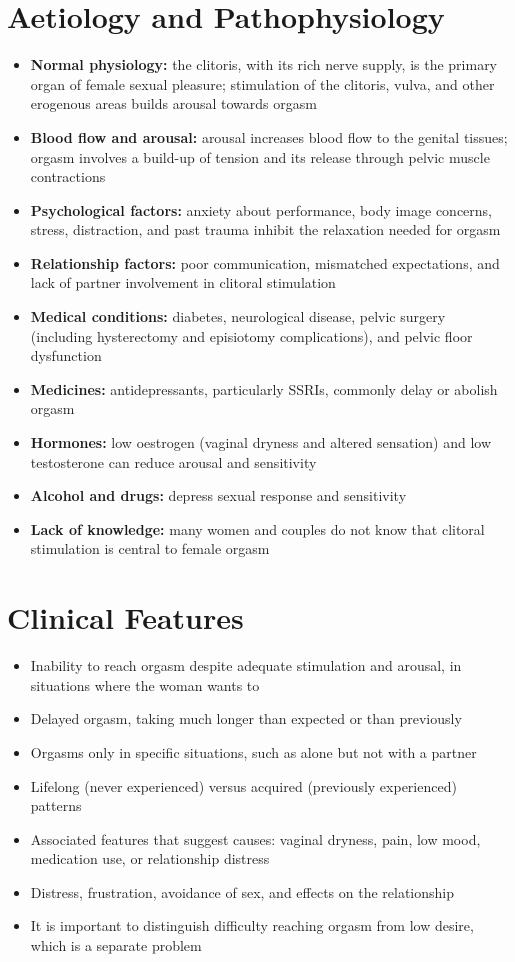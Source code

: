 \section*{Aetiology and Pathophysiology}
\begin{itemize}
    \item \textbf{Normal physiology:} the clitoris, with its rich nerve supply, is the primary organ of female sexual pleasure; stimulation of the clitoris, vulva, and other erogenous areas builds arousal towards orgasm
    \item \textbf{Blood flow and arousal:} arousal increases blood flow to the genital tissues; orgasm involves a build-up of tension and its release through pelvic muscle contractions
    \item \textbf{Psychological factors:} anxiety about performance, body image concerns, stress, distraction, and past trauma inhibit the relaxation needed for orgasm
    \item \textbf{Relationship factors:} poor communication, mismatched expectations, and lack of partner involvement in clitoral stimulation
    \item \textbf{Medical conditions:} diabetes, neurological disease, pelvic surgery (including hysterectomy and episiotomy complications), and pelvic floor dysfunction
    \item \textbf{Medicines:} antidepressants, particularly SSRIs, commonly delay or abolish orgasm
    \item \textbf{Hormones:} low oestrogen (vaginal dryness and altered sensation) and low testosterone can reduce arousal and sensitivity
    \item \textbf{Alcohol and drugs:} depress sexual response and sensitivity
    \item \textbf{Lack of knowledge:} many women and couples do not know that clitoral stimulation is central to female orgasm
\end{itemize}

\section*{Clinical Features}
\begin{itemize}
    \item Inability to reach orgasm despite adequate stimulation and arousal, in situations where the woman wants to
    \item Delayed orgasm, taking much longer than expected or than previously
    \item Orgasms only in specific situations, such as alone but not with a partner
    \item Lifelong (never experienced) versus acquired (previously experienced) patterns
    \item Associated features that suggest causes: vaginal dryness, pain, low mood, medication use, or relationship distress
    \item Distress, frustration, avoidance of sex, and effects on the relationship
    \item It is important to distinguish difficulty reaching orgasm from low desire, which is a separate problem
\end{itemize}

